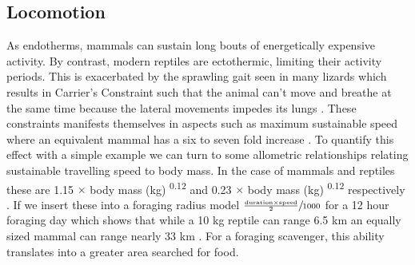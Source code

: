 \documentclass[a4paper,12pt]{article}
\begin{document}
\subsection*{Locomotion}
As endotherms, mammals can sustain long bouts of energetically expensive activity. 
By contrast, modern reptiles are ectothermic, limiting their activity periods.
This is exacerbated by the sprawling gait seen in many lizards which results in Carrier's Constraint such that the animal can't move and breathe at the same time because the lateral movements impedes its lungs \citep{carrier1987evolution}.
These constraints manifests themselves in aspects such as maximum sustainable speed where an equivalent mammal has a six to seven fold increase \citep{ruben1995evolution}.
To quantify this effect with a simple example we can turn to some allometric relationships relating sustainable travelling speed to body mass.
In the case of mammals and reptiles these are 1.15 $\times$ body mass (kg) \textsuperscript{0.12} and 0.23 $\times$ body mass (kg) \textsuperscript{0.12} respectively \citep{ruxton2004obligate}.
If we insert these into a foraging radius model $\sfrac{\frac{\text{duration} \times \text{speed}}{2}}{1000}$ for a 12 hour foraging day which shows that while a 10 kg reptile can range 6.5 km an equally sized mammal can range nearly 33 km \citep{Enstipp2006Energetics}. 
For a foraging scavenger, this ability translates into a greater area searched for food. 
\end{document}
